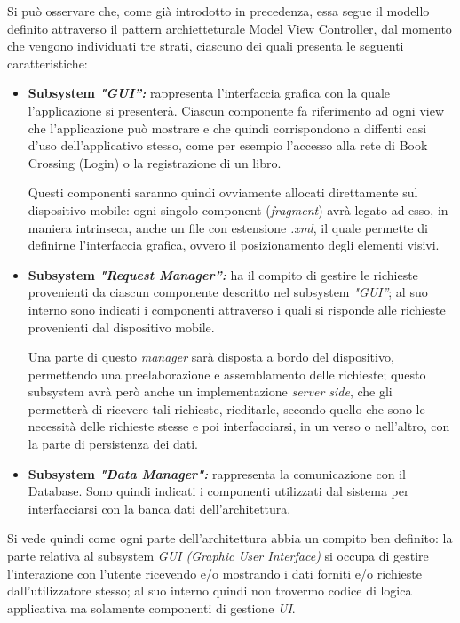 Si può osservare che, come già introdotto in precedenza, essa segue il modello definito attraverso il pattern archietteturale Model View Controller, dal momento che vengono individuati tre strati, ciascuno dei quali presenta le seguenti caratteristiche:
\begin{itemize}
	\item\label{subsysGUI} \textbf{Subsystem \textit{"GUI”:}} rappresenta l’interfaccia grafica con la quale l’applicazione si presenterà. Ciascun componente fa riferimento ad ogni view che l'applicazione può mostrare e che quindi corrispondono a diffenti casi d'uso dell'applicativo stesso, come per esempio l’accesso alla rete di Book Crossing (Login) o la registrazione di un libro.
	
	Questi componenti saranno quindi ovviamente allocati direttamente sul dispositivo mobile: ogni singolo component (\textit{fragment}) avrà legato ad esso, in maniera intrinseca, anche un file con estensione \textit{.xml}, il quale permette di definirne l'interfaccia grafica, ovvero il posizionamento degli elementi visivi.
	
	\item\label{subsysRequestManager} \textbf{Subsystem \textit{"Request Manager”:}} ha il compito di gestire le richieste provenienti da ciascun componente descritto nel subsystem \textit{"GUI”}; al suo interno sono indicati i componenti attraverso i quali si risponde alle richieste provenienti dal dispositivo mobile.
	
	Una parte di questo \textit{manager} sarà disposta a bordo del dispositivo, permettendo una preelaborazione e assemblamento delle richieste; questo subsystem avrà però anche un implementazione \textit{server side}, che gli permetterà di ricevere tali richieste, rieditarle, secondo quello che sono le necessità delle richieste stesse e poi interfacciarsi, in un verso o nell'altro, con la parte di persistenza dei dati.
	
	\item\label{subsysDataManager} \textbf{Subsystem \textit{"Data Manager":}} rappresenta la comunicazione con il Database. Sono quindi indicati i componenti utilizzati dal sistema per interfacciarsi con la banca dati dell’architettura.
\end{itemize}

Si vede quindi come ogni parte dell'architettura abbia un compito ben definito: la parte relativa al subsystem \textit{GUI (Graphic User Interface)} si occupa di gestire l'interazione con l'utente ricevendo e/o mostrando i dati forniti e/o richieste dall'utilizzatore stesso; al suo interno quindi non trovermo codice di logica applicativa ma solamente componenti di gestione \textit{UI}.

